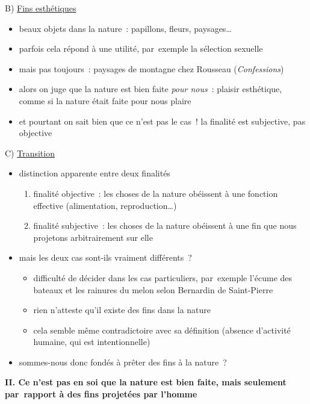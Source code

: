 \documentclass[a4paper,12pt]{article}
\begin{document}
\medskip

B) \uline{Fins esthétiques} 
\begin{itemize}
\item beaux objets dans la nature : papillons, fleurs, paysages\ldots{}
\item parfois cela répond à une utilité, par exemple la sélection sexuelle
\item mais pas toujours : paysages de montagne chez Rousseau (\emph{Confessions}​)
\item alors on juge que la nature est bien faite \emph{pour nous} : plaisir
esthétique, comme si la nature était faite pour nous plaire
\item et pourtant on sait bien que ce n'est pas le cas ! la finalité est
subjective, pas objective
\end{itemize}

\medskip

C) \uline{Transition}
\begin{itemize}
\item distinction apparente entre deux finalités
\begin{enumerate}
\item finalité objective : les choses de la nature obéissent à une
fonction effective (alimentation, reproduction\ldots{})
\item finalité subjective : les choses de la nature obéissent à une fin
que nous projetons arbitrairement sur elle
\end{enumerate}
\item mais les deux cas sont-ils vraiment différents ?
\begin{itemize}
\item difficulté de décider dans les cas particuliers, par exemple l'écume
des bateaux et les rainures du melon selon Bernardin de Saint-Pierre
\item rien n'atteste qu'il existe des fins dans la nature
\item cela semble même contradictoire avec sa définition (absence
d'activité humaine, qui est intentionnelle)
\end{itemize}
\item sommes-nous donc fondés à prêter des fins à la nature ?
\end{itemize}

\bigskip


\textbf{II. Ce n'est pas en soi que la nature est bien faite, mais seulement
par rapport à des fins projetées par l'homme}

\medskip
\end{document}
